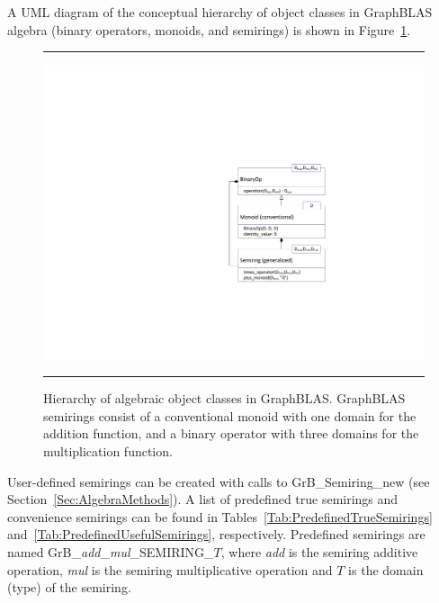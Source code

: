 A UML diagram of the conceptual hierarchy of object classes in GraphBLAS
algebra (binary operators, monoids, and semirings) is shown in 
Figure~\ref{Fig:AlgebraHierarchy}.

\begin{figure}[htb]
    \hrule
    \begin{center}
        \includegraphics[width=1.0\linewidth,trim=3in 2in 0.5in 2in]{Algebra_Hierarchy_v2_1.pdf}
    \end{center}
    \caption[Hierarchy of algebraic object classes in GraphBLAS.]{Hierarchy of algebraic object classes in GraphBLAS. GraphBLAS 
    semirings consist of a conventional monoid with one domain for the addition 
    function, and a binary operator with three domains for the multiplication function.}
    \label{Fig:AlgebraHierarchy}
    \hrule
\end{figure}

User-defined semirings can be created with calls to {\sf GrB\_Semiring\_new} 
(see Section~\ref{Sec:AlgebraMethods}).
A list of predefined true semirings and convenience
semirings can be found in Tables~\ref{Tab:PredefinedTrueSemirings} and~\ref{Tab:PredefinedUsefulSemirings},
respectively.  Predefined
semirings are named {\sf GrB\_\emph{add}\_\emph{mul}\_SEMIRING\_$T$},
where \emph{add} is the semiring additive operation, \emph{mul} is
the semiring multiplicative operation and $T$ is the domain (type)
of the semiring.


